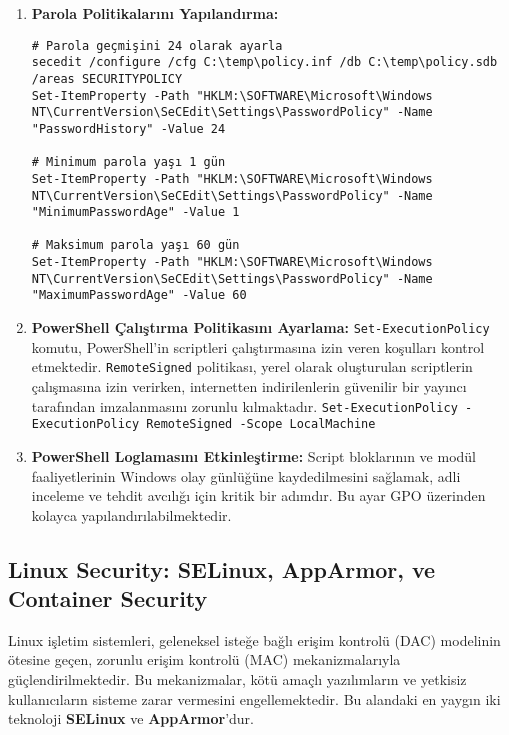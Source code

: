 \begin{enumerate}
    \item \textbf{Parola Politikalarını Yapılandırma:}
    \begin{verbatim}
# Parola geçmişini 24 olarak ayarla
secedit /configure /cfg C:\temp\policy.inf /db C:\temp\policy.sdb /areas SECURITYPOLICY
Set-ItemProperty -Path "HKLM:\SOFTWARE\Microsoft\Windows NT\CurrentVersion\SeCEdit\Settings\PasswordPolicy" -Name "PasswordHistory" -Value 24

# Minimum parola yaşı 1 gün
Set-ItemProperty -Path "HKLM:\SOFTWARE\Microsoft\Windows NT\CurrentVersion\SeCEdit\Settings\PasswordPolicy" -Name "MinimumPasswordAge" -Value 1

# Maksimum parola yaşı 60 gün
Set-ItemProperty -Path "HKLM:\SOFTWARE\Microsoft\Windows NT\CurrentVersion\SeCEdit\Settings\PasswordPolicy" -Name "MaximumPasswordAge" -Value 60
    \end{verbatim}
    \item \textbf{PowerShell Çalıştırma Politikasını Ayarlama:}
    \texttt{Set-ExecutionPolicy} komutu, PowerShell'in scriptleri çalıştırmasına izin veren koşulları kontrol etmektedir. \texttt{RemoteSigned} politikası, yerel olarak oluşturulan scriptlerin çalışmasına izin verirken, internetten indirilenlerin güvenilir bir yayıncı tarafından imzalanmasını zorunlu kılmaktadır.
    \texttt{Set-ExecutionPolicy -ExecutionPolicy RemoteSigned -Scope LocalMachine}
    \item \textbf{PowerShell Loglamasını Etkinleştirme:}
    Script bloklarının ve modül faaliyetlerinin Windows olay günlüğüne kaydedilmesini sağlamak, adli inceleme ve tehdit avcılığı için kritik bir adımdır. Bu ayar GPO üzerinden kolayca yapılandırılabilmektedir.
\end{enumerate}

\subsection{Linux Security: SELinux, AppArmor, ve Container Security}

Linux işletim sistemleri, geleneksel isteğe bağlı erişim kontrolü (DAC) modelinin ötesine geçen, zorunlu erişim kontrolü (MAC) mekanizmalarıyla güçlendirilmektedir. Bu mekanizmalar, kötü amaçlı yazılımların ve yetkisiz kullanıcıların sisteme zarar vermesini engellemektedir. Bu alandaki en yaygın iki teknoloji \textbf{SELinux} ve \textbf{AppArmor}'dur.

